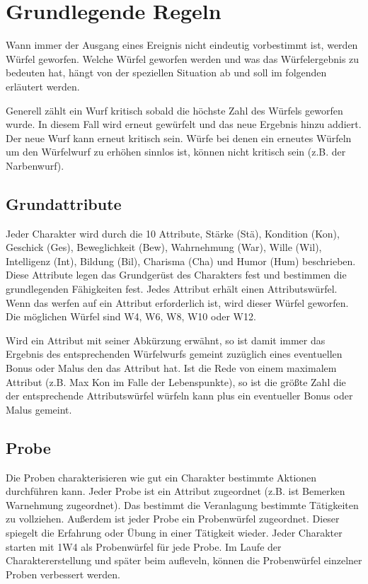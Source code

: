 \documentclass[../../Heldenanleitung2]{subfiles}
\begin{document}
\chapter{Grundlegende Regeln}
Wann immer der Ausgang eines Ereignis nicht eindeutig vorbestimmt ist, werden Würfel geworfen. Welche Würfel geworfen werden und was das Würfelergebnis zu bedeuten hat, hängt von der speziellen Situation ab und soll im folgenden erläutert werden.

Generell zählt ein Wurf kritisch sobald die höchste Zahl des Würfels geworfen wurde. In diesem Fall wird erneut gewürfelt und das neue Ergebnis hinzu addiert. Der neue Wurf kann erneut kritisch sein. Würfe bei denen ein erneutes Würfeln um den Würfelwurf zu erhöhen sinnlos ist, können nicht kritisch sein (z.B. der Narbenwurf).

\section{Grundattribute}
Jeder Charakter wird durch die 10 Attribute, Stärke (Stä), Kondition (Kon), Geschick (Ges), Beweglichkeit (Bew), Wahrnehmung (War), Wille (Wil), Intelligenz (Int), Bildung (Bil), Charisma (Cha) und Humor (Hum) beschrieben. Diese Attribute legen das Grundgerüst des Charakters fest und bestimmen die grundlegenden Fähigkeiten fest.
Jedes Attribut erhält einen Attributswürfel. Wenn das werfen auf ein Attribut erforderlich ist, wird dieser Würfel geworfen. Die möglichen Würfel sind W4, W6, W8, W10 oder W12. 

Wird ein Attribut mit seiner Abkürzung erwähnt, so ist damit immer das Ergebnis des entsprechenden Würfelwurfs gemeint zuzüglich eines eventuellen Bonus oder Malus den das Attribut hat. Ist die Rede von einem maximalem Attribut (z.B. Max Kon im Falle der Lebenspunkte), so ist die größte Zahl die der entsprechende Attributswürfel würfeln kann plus ein eventueller Bonus oder Malus gemeint.

\section{Probe}
Die Proben charakterisieren wie gut ein Charakter bestimmte Aktionen durchführen kann. Jeder Probe ist ein Attribut zugeordnet (z.B. ist Bemerken Warnehmung zugeordnet). Das bestimmt die Veranlagung bestimmte Tätigkeiten zu vollziehen. Außerdem ist jeder Probe ein Probenwürfel zugeordnet. Dieser spiegelt die Erfahrung oder Übung in einer Tätigkeit wieder. Jeder Charakter starten mit 1W4 als Probenwürfel für jede Probe. Im Laufe der Charaktererstellung und später beim aufleveln, können die Probenwürfel einzelner Proben verbessert werden.
\end{document}
